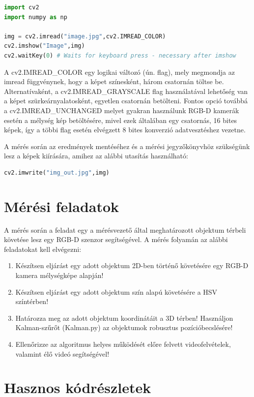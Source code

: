 \documentclass[12pt,a4paper,oneside]{report}             %
\begin{document}
\begin{lstlisting}[language=Python]
import cv2
import numpy as np

img = cv2.imread("image.jpg",cv2.IMREAD_COLOR)
cv2.imshow("Image",img)
cv2.waitKey(0) # Waits for keyboard press - necessary after imshow
\end{lstlisting}

A cv2.IMREAD\_COLOR egy logikai változó (ún. flag), mely megmondja az imread függvénynek, hogy a képet színesként, három csatornán töltse be.  Alternatívaként, a cv2.IMREAD\_GRAYSCALE flag használatával lehetőség van a képet szürkeárnyalatosként, egyetlen csatornán betölteni. Fontos opció továbbá a cv2.IMREAD\_UNCHANGED melyet gyakran használunk RGB-D kamerák esetén a mélység kép betöltésére, mivel ezek általában egy csatornás, 16 bites képek, így a többi flag esetén elvégzett 8 bites konverzió adatvesztéshez vezetne.

A mérés során az eredmények mentéséhez és a mérési jegyzőkönyvhöz szükségünk lesz a képek kiírására, amihez az alábbi utasítás használható:

\begin{lstlisting}[language=Python]
cv2.imwrite("img_out.jpg",img)
\end{lstlisting}

\chapter{Mérési feladatok}

A mérés során a feladat egy a mérésvezető által meghatározott objektum térbeli követése lesz egy RGB-D szenzor segítségével. A mérés folyamán az alábbi feladatokat kell elvégezni:

\begin{enumerate}
\item Készítsen eljárást egy adott objektum 2D-ben történő követésére egy RGB-D kamera mélységképe alapján!
\item Készítsen eljárást egy adott objektum szín alapú követésére a HSV színtérben!
\item Határozza meg az adott objektum koordinátáit a 3D térben! Használjon Kalman-szűrőt (Kalman.py) az objektumok robusztus pozícióbecslésére!
\item Ellenőrizze az algoritmus helyes működését előre felvett videofelvételek, valamint élő videó segítségével!
\end{enumerate}

\chapter{Hasznos kódrészletek}
\end{document}
